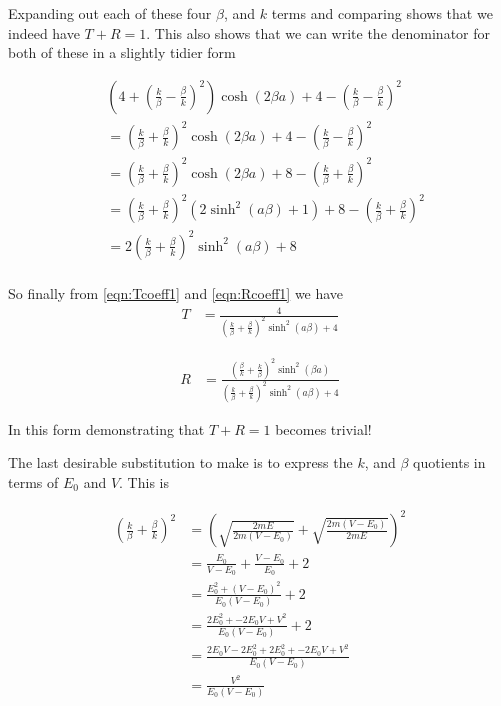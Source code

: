 \documentclass{article}
\begin{document}
Expanding out each of these four $\beta$, and $k$ terms and comparing shows that
we indeed have $T + R = 1$.  This also shows that we can write the denominator for both of
these 
in a 
slightly tidier form

\begin{align*}
&\left(4 + \left( \frac{k}{\beta} -\frac{\beta}{k} \right)^2 \right)
\cosh(2\beta a)
+ 
4 - \left(\frac{k}{\beta} - \frac{\beta}{k} \right)^2  \\
&=
\left( \frac{k}{\beta} +\frac{\beta}{k} \right)^2 
\cosh(2\beta a)
+ 
4 - \left(\frac{k}{\beta} - \frac{\beta}{k} \right)^2  \\
&=
\left( \frac{k}{\beta} +\frac{\beta}{k} \right)^2 
\cosh(2\beta a)
+ 
8 - \left(\frac{k}{\beta} + \frac{\beta}{k} \right)^2  \\
&=
\left( \frac{k}{\beta} +\frac{\beta}{k} \right)^2 
\left( 2 \sinh^2(a \beta) + 1\right)
+ 
8 - \left(\frac{k}{\beta} + \frac{\beta}{k} \right)^2  \\
&=
2 \left( \frac{k}{\beta} +\frac{\beta}{k} \right)^2 
\sinh^2(a \beta) + 8 \\
\end{align*}

So finally from \ref{eqn:Tcoeff1} and \ref{eqn:Rcoeff1} we have
\begin{align}
T 
&= \frac{4} { 
\left( \frac{k}{\beta} +\frac{\beta}{k} \right)^2 
\sinh^2(a \beta) + 4
}
\end{align}

\begin{align}
R 
&= \frac{ 
\left(\frac{\beta}{k} + \frac{k}{\beta} \right)^2 
\sinh^2( \beta a)} { 
\left( \frac{k}{\beta} +\frac{\beta}{k} \right)^2 
\sinh^2(a \beta) + 4 
}
\end{align}

In this form demonstrating that $T + R=1$ becomes trivial!

The last desirable substitution to make is to express the $k$, and $\beta$ quotients in terms of $E_0$ and $V$.  This is

\begin{align*}
\left(\frac{k}{\beta} + \frac{\beta}{k}\right)^2
&=
\left(\sqrt{\frac{2mE}{2m(V-E_0)}} + \sqrt{\frac{2m(V-E_0)}{2mE}}\right)^2 \\
&=
\frac{E_0}{V-E_0} + \frac{V-E_0}{E_0} + 2 \\
&=
\frac{E_0^2 + (V-E_0)^2}{E_0(V-E_0)} + 2 \\
&=
\frac{2 E_0^2 + -2 E_0 V + V^2 }{E_0(V-E_0)} + 2 \\
&=
\frac{2 E_0 V -2 E_0^2 + 2 E_0^2 + -2 E_0 V + V^2 }{E_0(V-E_0)} \\
&=
\frac{V^2 }{E_0(V-E_0)} \\
\end{align*}
\end{document}
